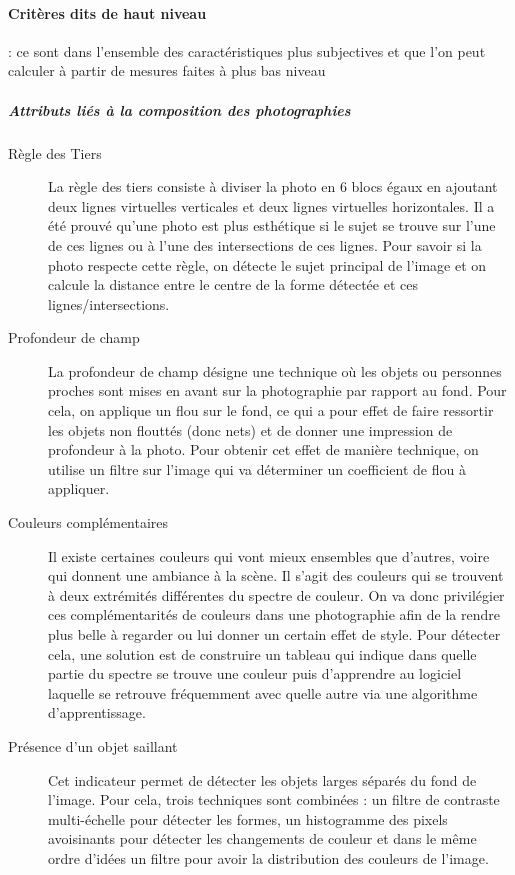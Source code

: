 \documentclass[11pt, french]{report-rd-info}
\begin{document}
\paragraph{Critères dits de haut niveau} : ce sont dans l'ensemble des caractéristiques plus subjectives et que l'on peut calculer à partir de mesures faites à plus bas niveau
\subparagraph{Attributs liés à la composition des photographies}
\begin{description}
\item[Règle des Tiers]
La règle des tiers consiste à diviser la photo en 6 blocs égaux en ajoutant deux lignes virtuelles verticales et deux lignes virtuelles horizontales. Il a  été prouvé qu’une photo est plus esthétique si le sujet se trouve sur l’une de ces lignes ou à l’une des intersections de ces lignes. Pour savoir si la photo respecte cette règle, on détecte le sujet principal de l’image et on calcule la distance entre le centre de la forme détectée et ces lignes/intersections.

\item[Profondeur de champ]
La profondeur de champ désigne une technique où les objets ou personnes proches sont mises en avant sur la photographie par rapport au fond. Pour cela, on applique un flou sur  le fond, ce qui a pour effet de faire ressortir les objets non flouttés (donc nets) et de donner une impression de profondeur à la photo. Pour obtenir cet effet de manière technique, on utilise un filtre sur l’image qui va déterminer un coefficient de flou à appliquer.

\item[Couleurs complémentaires]
Il existe certaines couleurs qui vont mieux ensembles que d’autres, voire qui donnent une ambiance à la scène. Il s’agit des couleurs qui se trouvent à deux extrémités différentes du spectre de couleur. On va donc privilégier ces complémentarités de couleurs dans une photographie afin de la rendre plus belle à regarder ou lui donner un certain effet de style. Pour détecter cela, une solution est de construire un tableau  qui indique dans quelle partie du spectre se trouve une couleur puis d’apprendre au logiciel laquelle se retrouve fréquemment  avec quelle autre via une algorithme d’apprentissage.

\item[Présence d'un objet saillant]
Cet indicateur permet de détecter les objets larges séparés du fond de l’image. Pour cela, trois techniques sont combinées : un filtre de contraste multi-échelle pour détecter les formes, un histogramme des pixels avoisinants pour détecter les changements de couleur et dans le même ordre d’idées un filtre pour avoir la distribution des couleurs de l’image.
\end{description}
\end{document}
